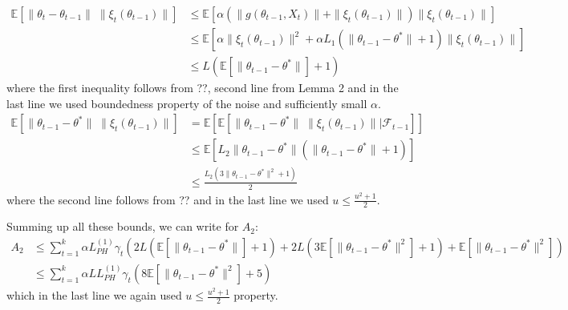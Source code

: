 \documentclass[a4paper]{article}
\newcommand{\norm}[1]{\|#1 \|}
\newcommand{\Exs}{\mathbb{E}}
\newcommand{\thetastar}{\theta^*}
\newcommand{\constLPH}[1]{L_{PH}^{(#1)}}
\newcommand{\stepsize}{\alpha}
\begin{document}
	\begin{align*}
		\Exs\left[\norm{\theta_{t} - \theta_{t - 1}} \; \norm{\xi_{t}\left(\theta_{t - 1}\right)}\right] & \leq \Exs\left[\stepsize \left(\norm{g\left(\theta_{t - 1}, X_{t}\right)} + \norm{\xi_{t}\left(\theta_{t - 1}\right)}\right)\norm{\xi_{t}\left(\theta_{t - 1}\right)}\right]\\
		& \leq \Exs\left[\stepsize\norm{\xi_{t}\left(\theta_{t - 1}\right)}^{2} + \stepsize L_{1}\left(\norm{\theta_{t - 1} - \thetastar} + 1\right)\norm{\xi_{t}\left(\theta_{t - 1}\right)}\right]\\
		& \leq L\left(\Exs\left[\norm{\theta_{t - 1} - \thetastar}\right] + 1\right)
	\end{align*}
	where the first inequality follows from ??, second line from Lemma 2 and in the last line we used boundedness property of the noise and sufficiently small $\stepsize$.
	\begin{align*}
		\Exs\left[\norm{\theta_{t - 1} - \thetastar} \; \norm{\xi_{t}\left(\theta_{t - 1}\right)}\right] &= \Exs\left[\Exs\left[\norm{\theta_{t - 1} - \thetastar} \; \norm{\xi_{t}\left(\theta_{t - 1}\right)} | \mathcal{F}_{t - 1}\right]\right]\\
		& \leq \Exs\left[L_{2}\norm{\theta_{t - 1} - \thetastar}\left(\norm{\theta_{t -1} - \thetastar} + 1\right)\right]\\
		& \leq \frac{L_{2}\left(3\norm{\theta_{t - 1} - \thetastar}^{2} + 1\right)}{2}
	\end{align*}
	where the second line follows from ?? and in the last line we used $u \leq \frac{u^{2} + 1}{2}$.
		
	Summing up all these bounds, we can write for $A_{2}$:
	\begin{align*}
		A_{2} & \leq \sum_{t = 1}^{k}\stepsize \constLPH{1}\gamma_{t}\left(2L\left(\Exs\left[\norm{\theta_{t - 1} - \thetastar}\right] + 1\right) + 2L\left(3\Exs\left[\norm{\theta_{t - 1} - \thetastar}^{2}\right] + 1\right) + \Exs\left[\norm{\theta_{t - 1} - \thetastar}^{2}\right]\right)\\
		& \leq \sum_{t = 1}^{k}\stepsize L \constLPH{1}\gamma_{t}\left(8\Exs\left[\norm{\theta_{t - 1} - \thetastar}^{2}\right] + 5\right)
	\end{align*}
	which in the last line we again used $u \leq \frac{u^{2} + 1}{2}$ property.	
		
\end{document}
